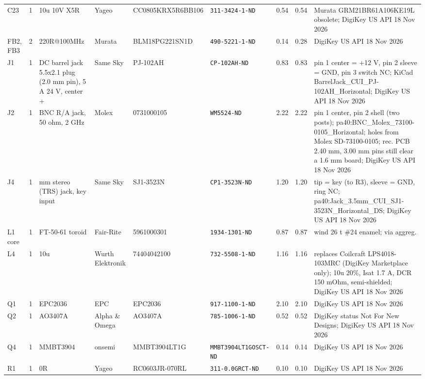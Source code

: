 \begin{longtable}{@{}p{1.8cm}r >{\raggedright\arraybackslash}p{2.3cm} >{\raggedright\arraybackslash}p{1.9cm} p{3.7cm} p{4.4cm} r r >{\raggedright\arraybackslash}p{3.9cm}@{}}
C23 & 1 & 10u 10V X5R & Yageo & CC0805KRX5R6BB106 & \texttt{\footnotesize 311-3424-1-ND} & 0.54 & 0.54 & Murata GRM21BR61A106KE19L obsolete; DigiKey US API 18 Nov 2026\\
FB2, FB3 & 2 & 220R@100MHz & Murata & BLM18PG221SN1D & \texttt{\footnotesize 490-5221-1-ND} & 0.14 & 0.28 & DigiKey US API 18 Nov 2026\\
J1 & 1 & DC barrel jack 5.5x2.1 plug (2.0 mm pin), 5 A 24 V, center + & Same Sky & PJ-102AH & \texttt{\footnotesize CP-102AH-ND} & 0.83 & 0.83 & pin 1 center = +12 V, pin 2 sleeve = GND, pin 3 switch NC; KiCad BarrelJack\_\allowbreak{}CUI\_\allowbreak{}PJ-102AH\_\allowbreak{}Horizontal; DigiKey US API 18 Nov 2026\\
J2 & 1 & BNC R/A jack, 50 ohm, 2 GHz & Molex & 0731000105 & \texttt{\footnotesize WM5524-ND} & 2.22 & 2.22 & pin 1 center, pin 2 shell (two posts); pa40:BNC\_\allowbreak{}Molex\_\allowbreak{}73100-0105\_\allowbreak{}Horizontal; holes from Molex SD-73100-0105; rec. PCB 2.40 mm, 3.00 mm pins still clear a 1.6 mm board; DigiKey US API 18 Nov 2026\\
J4 & 1 & 3.5 mm stereo (TRS) jack, key input & Same Sky & SJ1-3523N & \texttt{\footnotesize CP1-3523N-ND} & 1.20 & 1.20 & tip = key (to R3), sleeve = GND, ring NC; pa40:Jack\_\allowbreak{}3.5mm\_\allowbreak{}CUI\_\allowbreak{}SJ1-3523N\_\allowbreak{}Horizontal\_\allowbreak{}DS; DigiKey US API 18 Nov 2026\\
L1 core & 1 & FT-50-61 toroid & Fair-Rite & 5961000301 & \texttt{\footnotesize 1934-1301-ND} & 0.87 & 0.87 & wind 26 t \#24 enamel; via aggreg.\\
L4 & 1 & 10u & Wurth Elektronik & 74404042100 & \texttt{\footnotesize 732-5508-1-ND} & 1.16 & 1.16 & replaces Coilcraft LPS4018-103MRC (DigiKey Marketplace only); 10u 20\%, Isat 1.7 A, DCR 150 mOhm, semi-shielded; DigiKey US API 18 Nov 2026\\
Q1 & 1 & EPC2036 & EPC & EPC2036 & \texttt{\footnotesize 917-1100-1-ND} & 2.10 & 2.10 & DigiKey US API 18 Nov 2026\\
Q2 & 1 & AO3407A & Alpha \& Omega & AO3407A & \texttt{\footnotesize 785-1006-1-ND} & 0.52 & 0.52 & DigiKey status Not For New Designs; DigiKey US API 18 Nov 2026\\
Q4 & 1 & MMBT3904 & onsemi & MMBT3904LT1G & \texttt{\footnotesize MMBT3904LT1GOSCT-ND} & 0.14 & 0.14 & DigiKey US API 18 Nov 2026\\
R1 & 1 & 0R & Yageo & RC0603JR-070RL & \texttt{\footnotesize 311-0.0GRCT-ND} & 0.10 & 0.10 & DigiKey US API 18 Nov 2026\\

\end{longtable}
